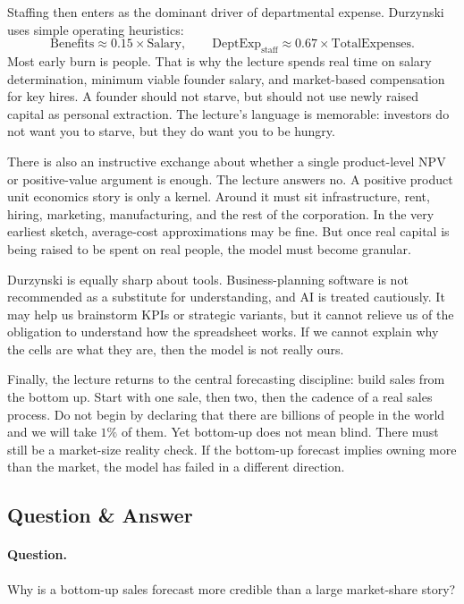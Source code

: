 Staffing then enters as the dominant driver of departmental expense. Durzynski uses simple operating heuristics:
\begin{equation}
\mathrm{Benefits} \approx 0.15 \times \mathrm{Salary},
\qquad
\mathrm{DeptExp}_{\mathrm{staff}} \approx 0.67 \times \mathrm{TotalExpenses}.
\end{equation}
Most early burn is people. That is why the lecture spends real time on salary determination, minimum viable founder salary, and market-based compensation for key hires. A founder should not starve, but should not use newly raised capital as personal extraction. The lecture's language is memorable: investors do not want you to starve, but they do want you to be hungry.

There is also an instructive exchange about whether a single product-level NPV or positive-value argument is enough. The lecture answers no. A positive product unit economics story is only a kernel. Around it must sit infrastructure, rent, hiring, marketing, manufacturing, and the rest of the corporation. In the very earliest sketch, average-cost approximations may be fine. But once real capital is being raised to be spent on real people, the model must become granular.

Durzynski is equally sharp about tools. Business-planning software is not recommended as a substitute for understanding, and AI is treated cautiously. It may help us brainstorm KPIs or strategic variants, but it cannot relieve us of the obligation to understand how the spreadsheet works. If we cannot explain why the cells are what they are, then the model is not really ours.

Finally, the lecture returns to the central forecasting discipline: build sales from the bottom up. Start with one sale, then two, then the cadence of a real sales process. Do not begin by declaring that there are billions of people in the world and we will take \(1\%\) of them. Yet bottom-up does not mean blind. There must still be a market-size reality check. If the bottom-up forecast implies owning more than the market, the model has failed in a different direction.

\subsection{Question \& Answer}

\paragraph{Question.}
Why is a bottom-up sales forecast more credible than a large market-share story?

